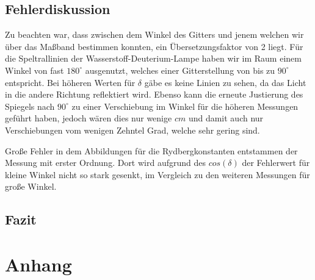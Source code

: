 \documentclass[]{article}
\begin{document}
\subsection{Fehlerdiskussion}

Zu beachten war, dass zwischen dem Winkel des Gitters und jenem welchen wir über das Maßband bestimmen konnten, ein Übersetzungsfaktor von 2 liegt. Für die Speltrallinien der Wasserstoff-Deuterium-Lampe haben wir im Raum einem Winkel von fast $180^\circ$ ausgenutzt, welches einer Gitterstellung von bis zu $90^\circ$ entspricht. Bei höheren Werten für $\delta$ gäbe es keine Linien zu sehen, da das Licht in die andere Richtung reflektiert wird. Ebenso kann die erneute Justierung des Spiegels nach $90^\circ$ zu einer Verschiebung im Winkel für die höheren Messungen geführt haben, jedoch wären dies nur wenige $cm$ und damit auch nur Verschiebungen vom wenigen Zehntel Grad, welche sehr gering sind.

Große Fehler in dem Abbildungen für die Rydbergkonstanten entstammen der Messung mit erster Ordnung. Dort wird aufgrund des $cos(\delta)$ der Fehlerwert für kleine Winkel nicht so stark gesenkt, im Vergleich zu den weiteren Messungen für große Winkel.

\subsection{Fazit}

\section{Anhang}
\end{document}
